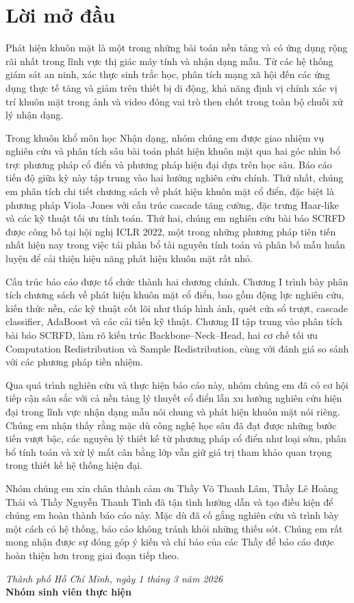 ﻿\chapter*{Lời mở đầu}

Phát hiện khuôn mặt là một trong những bài toán nền tảng và có ứng dụng rộng rãi nhất trong lĩnh vực thị giác máy tính và nhận dạng mẫu. Từ các hệ thống giám sát an ninh, xác thực sinh trắc học, phân tích mạng xã hội đến các ứng dụng thực tế tăng và giảm trên thiết bị di động, khả năng định vị chính xác vị trí khuôn mặt trong ảnh và video đóng vai trò then chốt trong toàn bộ chuỗi xử lý nhận dạng.

Trong khuôn khổ môn học Nhận dạng, nhóm chúng em được giao nhiệm vụ nghiên cứu và phân tích sâu bài toán phát hiện khuôn mặt qua hai góc nhìn bổ trợ: phương pháp cổ điển và phương pháp hiện đại dựa trên học sâu. Báo cáo tiến độ giữa kỳ này tập trung vào hai hướng nghiên cứu chính. Thứ nhất, chúng em phân tích chi tiết chương sách về phát hiện khuôn mặt cổ điển, đặc biệt là phương pháp Viola--Jones với cấu trúc cascade tăng cường, đặc trưng Haar-like và các kỹ thuật tối ưu tính toán. Thứ hai, chúng em nghiên cứu bài báo SCRFD được công bố tại hội nghị ICLR 2022, một trong những phương pháp tiên tiến nhất hiện nay trong việc tái phân bổ tài nguyên tính toán và phân bố mẫu huấn luyện để cải thiện hiệu năng phát hiện khuôn mặt rất nhỏ.

Cấu trúc báo cáo được tổ chức thành hai chương chính. Chương I trình bày phân tích chương sách về phát hiện khuôn mặt cổ điển, bao gồm động lực nghiên cứu, kiến thức nền, các kỹ thuật cốt lõi như tháp hình ảnh, quét cửa sổ trượt, cascade classifier, AdaBoost và các cải tiến kỹ thuật. Chương II tập trung vào phân tích bài báo SCRFD, làm rõ kiến trúc Backbone--Neck--Head, hai cơ chế tối ưu Computation Redistribution và Sample Redistribution, cùng với đánh giá so sánh với các phương pháp tiền nhiệm.

Qua quá trình nghiên cứu và thực hiện báo cáo này, nhóm chúng em đã có cơ hội tiếp cận sâu sắc với cả nền tảng lý thuyết cổ điển lẫn xu hướng nghiên cứu hiện đại trong lĩnh vực nhận dạng mẫu nói chung và phát hiện khuôn mặt nói riêng. Chúng em nhận thấy rằng mặc dù công nghệ học sâu đã đạt được những bước tiến vượt bậc, các nguyên lý thiết kế từ phương pháp cổ điển như loại sớm, phân bổ tính toán và xử lý mất cân bằng lớp vẫn giữ giá trị tham khảo quan trọng trong thiết kế hệ thống hiện đại.

Nhóm chúng em xin chân thành cảm ơn Thầy Võ Thanh Lâm, Thầy Lê Hoàng Thái và Thầy Nguyễn Thanh Tình đã tận tình hướng dẫn và tạo điều kiện để chúng em hoàn thành báo cáo này. Mặc dù đã cố gắng nghiên cứu và trình bày một cách có hệ thống, báo cáo không tránh khỏi những thiếu sót. Chúng em rất mong nhận được sự đóng góp ý kiến và chỉ bảo của các Thầy để báo cáo được hoàn thiện hơn trong giai đoạn tiếp theo.

\vspace{1.5cm}
\begin{flushright}
\textit{Thành phố Hồ Chí Minh, ngày 1 tháng 3 năm 2026}\\[0.5cm]
\textbf{Nhóm sinh viên thực hiện}
\end{flushright}
